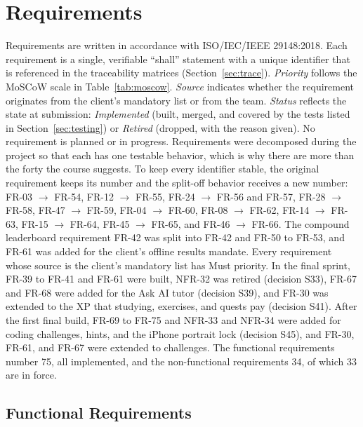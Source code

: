 \documentclass[12pt,letterpaper]{article}
\begin{document}
\section{Requirements}\label{sec:reqs}
Requirements are written in accordance with ISO/IEC/IEEE 29148:2018. Each
requirement is a single, verifiable ``shall'' statement with a unique identifier that
is referenced in the traceability matrices (Section~\ref{sec:trace}). \emph{Priority}
follows the MoSCoW scale in Table~\ref{tab:moscow}. \emph{Source} indicates whether
the requirement originates from the client's mandatory list or from the team.
\emph{Status} reflects the state at submission: \emph{Implemented} (built, merged,
and covered by the tests listed in Section~\ref{sec:testing}) or \emph{Retired}
(dropped, with the reason given). No requirement is planned or in progress.
Requirements were decomposed during the project so that each has one testable
behavior, which is why there are more than the forty the course suggests. To keep every identifier stable, the original requirement
keeps its number and the split-off behavior receives a new number: FR-03 $\to$ FR-54,
FR-12 $\to$ FR-55, FR-24 $\to$ FR-56 and FR-57, FR-28 $\to$ FR-58, FR-47 $\to$ FR-59,
FR-04 $\to$ FR-60, FR-08 $\to$ FR-62, FR-14 $\to$ FR-63, FR-15 $\to$ FR-64,
FR-45 $\to$ FR-65, and FR-46 $\to$ FR-66. The compound leaderboard requirement FR-42
was split into FR-42 and FR-50 to FR-53, and FR-61 was added for the client's offline
results mandate. Every requirement whose source is the client's mandatory list has
Must priority. In the final sprint, FR-39 to FR-41 and FR-61 were built, NFR-32 was
retired (decision S33), FR-67 and FR-68 were added for
the Ask AI tutor (decision S39), and FR-30 was extended to the XP that studying,
exercises, and quests pay (decision S41). After the first final build, FR-69 to FR-75
and NFR-33 and NFR-34 were added for coding challenges, hints, and the iPhone
portrait lock (decision S45), and FR-30, FR-61, and FR-67 were extended to
challenges. The functional requirements number 75, all implemented, and the
non-functional requirements 34, of which 33 are in force.

\subsection{Functional Requirements}
\end{document}
